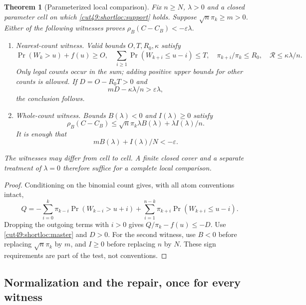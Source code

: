 \documentclass[11pt,a4paper]{article}
\numberwithin{equation}{section}
\newtheorem{theorem}{Theorem}[section]
\theoremstyle{definition}
\theoremstyle{remark}
\begin{document}
\begin{theorem}[Parameterized local comparison]\label{cut49:shortloc:theorem}
Fix $n\ge N$, $\lambda>0$ and a closed parameter cell on which
\eqref{cut49:shortloc:support} holds. Suppose $\sqrt n\pi_k\ge m>0$.
Either of the following witnesses proves $\rho_B(C-C_B)<-\varepsilon\lambda$.
\begin{enumerate}
\item \emph{Nearest-count witness.} Valid bounds $O,T,R_0,\kappa$ satisfy
\[
 \Pr(W_k>u)+f(u)\ge O,\quad
 \sum_{i\ge1}\Pr(W_{k+i}\le u-i)\le T,\quad
 \pi_{k+i}/\pi_k\le R_0,\quad \mathcal R\le\kappa\lambda/n.
\]
Only legal counts occur in the sum; adding positive upper bounds for
other counts is allowed. If $D=O-R_0T>0$ and
\begin{equation}\label{cut49:shortloc:directtest}
             mD-\kappa\lambda/n>\varepsilon\lambda,
\end{equation}
the conclusion follows.
\item \emph{Whole-count witness.} Bounds $B(\lambda)<0$ and $I(\lambda)\ge0$
satisfy
\[
 \rho_B(C-C_B)\le\sqrt n\pi_k\lambda B(\lambda)
                                      +\lambda I(\lambda)/n.
\]
It is enough that
\begin{equation}\label{cut49:shortloc:whole-test}
                  mB(\lambda)+I(\lambda)/N<-\varepsilon.
\end{equation}
\end{enumerate}
The witnesses may differ from cell to cell. A finite closed cover and a
separate treatment of $\lambda=0$ therefore suffice for a complete local
comparison.
\end{theorem}
\begin{proof}
Conditioning on the binomial count gives, with all atom conventions intact,
\begin{equation}\label{cut49:shortloc:count}
 Q=-\sum_{i=0}^{k}\pi_{k-i}\Pr(W_{k-i}>u+i)
       +\sum_{i=1}^{n-k}\pi_{k+i}\Pr(W_{k+i}\le u-i).
\end{equation}
Dropping the outgoing terms with $i>0$ gives $Q/\pi_k-f(u)\le-D$.
Use \eqref{cut49:shortloc:master} and $D>0$. For the second witness, use
$B<0$ before replacing $\sqrt n\pi_k$ by $m$, and $I\ge0$ before replacing
$n$ by $N$. These sign requirements are part of the test, not conventions.
\end{proof}

\subsection{Normalization and the repair, once for every witness}
\end{document}
